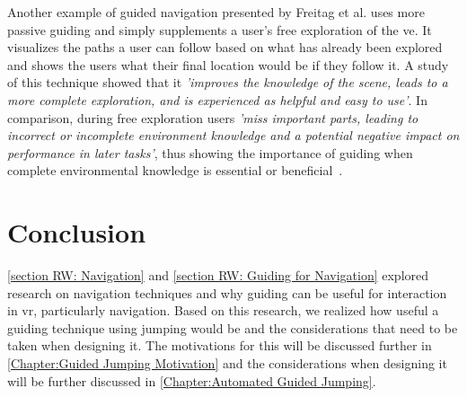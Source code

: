Another example of guided navigation presented by Freitag et al. uses more passive guiding and simply supplements a user's free exploration of the \acrshort{ve}. It visualizes the paths a user can follow based on what has already been explored and shows the users what their final location would be if they follow it. A study of this technique showed that it \textit{'improves the knowledge of the scene, leads to a more complete exploration, and is experienced as helpful and easy to use'}. In comparison, during free exploration users \textit{'miss important parts, leading to incorrect or incomplete environment knowledge and a potential negative impact on performance in later tasks'}, thus showing the importance of guiding when complete environmental knowledge is essential or beneficial~\cite{Freitag2018}.

\section{Conclusion}
\label{section RW: Conclusion}
\cref{section RW: Navigation} and \cref{section RW: Guiding for Navigation} explored research on navigation techniques and why guiding can be useful for interaction in \acrshort{vr}, particularly navigation. Based on this research, we realized how useful a guiding technique using jumping would be and the considerations that need to be taken when designing it. The motivations for this will be discussed further in \cref{Chapter:Guided Jumping Motivation} and the considerations when designing it will be further discussed in \cref{Chapter:Automated Guided Jumping}.